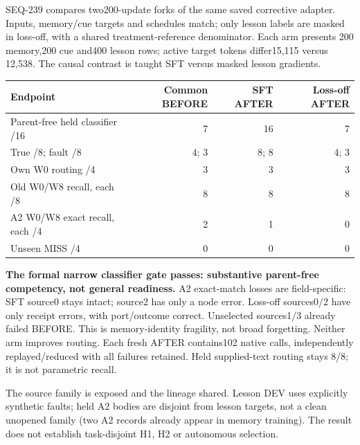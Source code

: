 \documentclass[11pt]{article}
\begin{document}
SEQ-239 compares two200-update forks of the same saved corrective adapter.
Inputs, memory/cue targets and schedules match; only lesson labels are masked
in loss-off, with a shared treatment-reference denominator. Each arm presents
200 memory,200 cue and400 lesson rows; active target tokens differ15,115 versus
12,538. The causal contrast is taught SFT versus masked lesson gradients.

\begin{center}
\small
\begin{tabular}{lrrr}
\toprule
Endpoint & Common BEFORE & SFT AFTER & Loss-off AFTER \\
\midrule
Parent-free held classifier /16 & 7 & 16 & 7 \\
True /8; fault /8 & 4; 3 & 8; 8 & 4; 3 \\
Own W0 routing /4 & 3 & 3 & 3 \\
Old W0/W8 recall, each /8 & 8 & 8 & 8 \\
A2 W0/W8 exact recall, each /4 & 2 & 1 & 0 \\
Unseen MISS /4 & 0 & 0 & 0 \\
\bottomrule
\end{tabular}
\end{center}

\textbf{The formal narrow classifier gate passes: substantive parent-free competency,
not general readiness.} A2 exact-match losses are field-specific: SFT source0
stays intact; source2 has only a node error. Loss-off sources0/2 have only
receipt errors, with port/outcome correct. Unselected sources1/3 already failed
BEFORE. This is memory-identity fragility, not broad forgetting. Neither arm
improves routing. Each fresh AFTER contains102 native calls, independently
replayed/reduced with all failures retained. Held supplied-text routing stays
8/8; it is not parametric recall.

The source family is exposed and the lineage shared. Lesson DEV uses explicitly
synthetic faults; held A2 bodies are disjoint from lesson targets, not a clean
unopened family (two A2 records already appear in memory training). The result
does not establish task-disjoint H1, H2 or autonomous selection.
\end{document}
